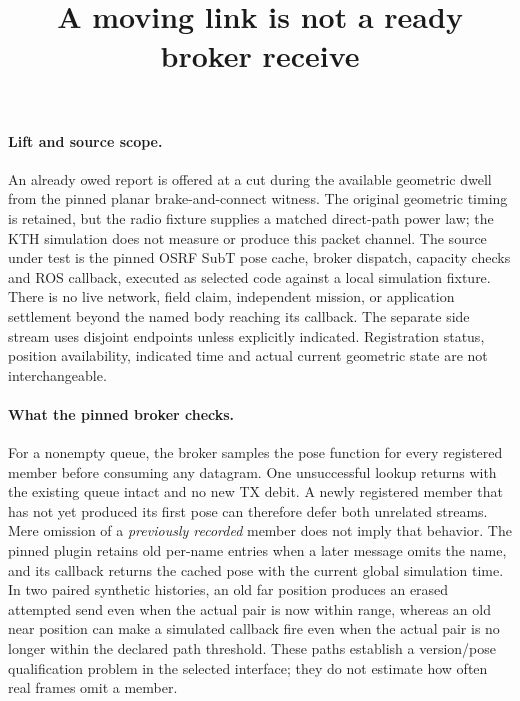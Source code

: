\documentclass[11pt]{article}
\title{A moving link is not a ready broker receive}
\begin{document}
\maketitle
\paragraph{Lift and source scope.}
An already owed report is offered at a cut during the available
geometric dwell from the pinned planar brake-and-connect witness.
The original geometric timing is retained, but the radio fixture
supplies a matched direct-path power law; the KTH simulation does
not measure or produce this packet channel. The source under test
is the pinned OSRF SubT pose cache, broker dispatch, capacity checks
and ROS callback, executed as selected code against a local simulation
fixture. There is no live network, field claim, independent mission,
or application settlement beyond the named body reaching its callback.
The separate side stream uses disjoint endpoints unless explicitly
indicated. Registration status, position availability, indicated
time and actual current geometric state are not interchangeable.

\paragraph{What the pinned broker checks.}
For a nonempty queue, the broker samples the pose function for every
registered member before consuming any datagram. One unsuccessful
lookup returns with the existing queue intact and no new TX debit.
A newly registered member that has not yet produced its first pose
can therefore defer both unrelated streams. Mere omission of a
\emph{previously recorded} member does not imply that behavior.
The pinned plugin retains old per-name entries when a later message
omits the name, and its callback returns the cached pose with the
current global simulation time. In two paired synthetic histories,
an old far position produces an erased attempted send even when
the actual pair is now within range, whereas an old near position
can make a simulated callback fire even when the actual pair is
no longer within the declared path threshold. These paths establish
a version/pose qualification problem in the selected interface;
they do not estimate how often real frames omit a member.
\end{document}
